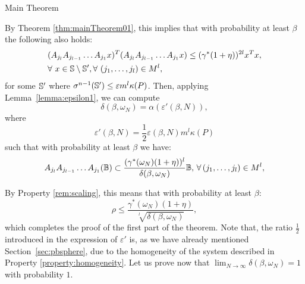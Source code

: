 \begin{subsection}{Main Theorem}
\begin{pf}
By Theorem \ref{thm:mainTheorem01}, this implies that with probability at least $\beta$ the following also holds:
\begin{equation}
\begin{aligned}
& (A_{j_l} A_{j_{l-1}} \dots A_{j_1} x)^T (A_{j_l} A_{j_{l-1}} \dots A_{j_1} x) \leq ( \gamma^{*}(1+\eta) )^{2l} x^T x, \\
& \forall\ x \in \sphere \setminus \sphere', \forall\ (j_1,\dots,j_l) \in M^l,
\end{aligned}
\end{equation}
for some $\mathbb{S}'$ where $\sigma^{n-1}(\mathbb{S}') \leq \varepsilon m^l \kappa(P)$. Then, applying Lemma~\ref{lemma:epsilon1}, we can compute
$$\delta(\beta, \omega_N) =\alpha(\varepsilon'(\beta,N)),$$
where
\begin{equation}\label{eqn:eps2}
\varepsilon'(\beta, N) = \frac{1}{2} \varepsilon(\beta,N) m^l \kappa(P) 
\end{equation} 
such that with probability at least $\beta$ we have:
\begin{equation*}
A_{j_l} A_{j_{l-1}} \dots A_{j_1} (\mathbb{B}) \subset \frac{(\gamma^{*}(\omega_N)(1+\eta))^l}{\delta(\beta, \omega_N)}\mathbb{B},\, \forall\, (j_1,\dots,j_l) \in M^l,
\end{equation*}

By Property \ref{rem:scaling}, this means that with probability at least $\beta$:
$$\rho \leq \frac{\gamma^{*}(\omega_N) (1 + \eta)}{\sqrt[l]{\delta(\beta, \omega_N)}},$$
which completes the proof of the first part of the theorem. Note that, the ratio $\frac{1}{2}$ introduced in the expression of $\varepsilon'$ is, as we have already mentioned Section~\ref{sec:pbsphere}, due to the homogeneity of the system described in Property \ref{property:homogeneity}.
%
%
Let us prove now that $\lim_{N \to \infty} \delta(\beta, \omega_N) = 1$ with probability $1$.


\end{pf}
\end{subsection}
